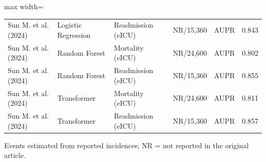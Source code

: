\begin{table}[H]
\begin{adjustbox}{max width=\textwidth}
\begin{tabular}{llllll}
    Sun M. et al. (2024) & Logistic Regression & Readmission (eICU) & NR/15,360 & AUPR & 0.843 \\
    Sun M. et al. (2024) & Random Forest & Mortality (eICU) & NR/24,600 & AUPR & 0.802 \\
    Sun M. et al. (2024) & Random Forest & Readmission (eICU) & NR/15,360 & AUPR & 0.855 \\
    Sun M. et al. (2024) & Transformer & Mortality (eICU) & NR/24,600 & AUPR & 0.811 \\
    Sun M. et al. (2024) & Transformer & Readmission (eICU) & NR/15,360 & AUPR & 0.857 \\
\bottomrule
\end{tabular}
\end{adjustbox}
\par\vspace{0.4em}\footnotesize * Events estimated from reported incidences; NR = not reported in the original article.
\end{table}
